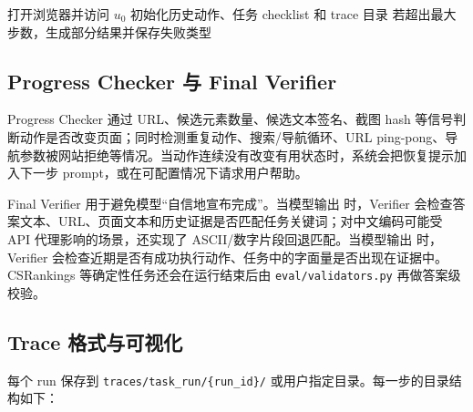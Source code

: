 \begin{algorithm}[H]
  \caption{单任务多步运行流程}
  \label{alg:run-task}
  打开浏览器并访问 $u_0$\;
  初始化历史动作、任务 checklist 和 trace 目录\;
  若超出最大步数，生成部分结果并保存失败类型\;
\end{algorithm}

\subsection{Progress Checker 与 Final Verifier}

Progress Checker 通过 URL、候选元素数量、候选文本签名、截图 hash 等信号判断动作是否改变页面；同时检测重复动作、搜索/导航循环、URL ping-pong、导航参数被网站拒绝等情况。当动作连续没有改变有用状态时，系统会把恢复提示加入下一步 prompt，或在可配置情况下请求用户帮助。

Final Verifier 用于避免模型“自信地宣布完成”。当模型输出  时，Verifier 会检查答案文本、URL、页面文本和历史证据是否匹配任务关键词；对中文编码可能受 API 代理影响的场景，还实现了 ASCII/数字片段回退匹配。当模型输出  时，Verifier 会检查近期是否有成功执行动作、任务中的字面量是否出现在证据中。CSRankings 等确定性任务还会在运行结束后由 \texttt{eval/validators.py} 再做答案级校验。

\subsection{Trace 格式与可视化}

每个 run 保存到 \texttt{traces/task\_run/\{run\_id\}/} 或用户指定目录。每一步的目录结构如下：

